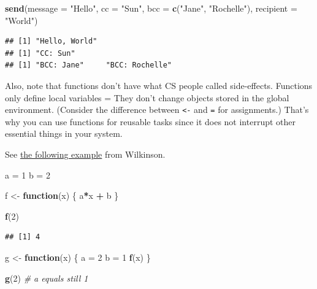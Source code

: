 \documentclass[
]{book}
\newenvironment{Shaded}{\begin{snugshade}}{\end{snugshade}}
\newcommand{\AttributeTok}[1]{\textcolor[rgb]{0.13,0.29,0.53}{#1}}
\newcommand{\CommentTok}[1]{\textcolor[rgb]{0.56,0.35,0.01}{\textit{#1}}}
\newcommand{\ControlFlowTok}[1]{\textcolor[rgb]{0.13,0.29,0.53}{\textbf{#1}}}
\newcommand{\DecValTok}[1]{\textcolor[rgb]{0.00,0.00,0.81}{#1}}
\newcommand{\FunctionTok}[1]{\textcolor[rgb]{0.13,0.29,0.53}{\textbf{#1}}}
\newcommand{\NormalTok}[1]{#1}
\newcommand{\OtherTok}[1]{\textcolor[rgb]{0.56,0.35,0.01}{#1}}
\newcommand{\SpecialCharTok}[1]{\textcolor[rgb]{0.81,0.36,0.00}{\textbf{#1}}}
\newcommand{\StringTok}[1]{\textcolor[rgb]{0.31,0.60,0.02}{#1}}
\begin{document}
\begin{Shaded}
\begin{Highlighting}[]
\FunctionTok{send}\NormalTok{(}\AttributeTok{message =} \StringTok{"Hello"}\NormalTok{, }\AttributeTok{cc =} \StringTok{"Sun"}\NormalTok{, }\AttributeTok{bcc =} \FunctionTok{c}\NormalTok{(}\StringTok{"Jane"}\NormalTok{, }\StringTok{"Rochelle"}\NormalTok{), }\AttributeTok{recipient =} \StringTok{"World"}\NormalTok{)}
\end{Highlighting}
\end{Shaded}

\begin{verbatim}
## [1] "Hello, World"
## [1] "CC: Sun"
## [1] "BCC: Jane"     "BCC: Rochelle"
\end{verbatim}

Also, note that functions don't have what CS people called side-effects. Functions only define local variables = They don't change objects stored in the global environment. (Consider the difference between \texttt{\textless{}-} and \texttt{=} for assignments.) That's why you can use functions for reusable tasks since it does not interrupt other essential things in your system.

See \href{https://darrenjw.wordpress.com/2011/11/23/lexical-scope-and-function-closures-in-r/}{the following example} from Wilkinson.

\begin{Shaded}
\begin{Highlighting}[]
\NormalTok{a }\OtherTok{=} \DecValTok{1} 
\NormalTok{b }\OtherTok{=} \DecValTok{2}

\NormalTok{f }\OtherTok{\textless{}{-}} \ControlFlowTok{function}\NormalTok{(x)}
\NormalTok{\{}
\NormalTok{  a}\SpecialCharTok{*}\NormalTok{x }\SpecialCharTok{+}\NormalTok{ b}
\NormalTok{\}}

\FunctionTok{f}\NormalTok{(}\DecValTok{2}\NormalTok{)}
\end{Highlighting}
\end{Shaded}

\begin{verbatim}
## [1] 4
\end{verbatim}

\begin{Shaded}
\begin{Highlighting}[]
\NormalTok{g }\OtherTok{\textless{}{-}} \ControlFlowTok{function}\NormalTok{(x)}
\NormalTok{\{}
\NormalTok{  a }\OtherTok{=} \DecValTok{2}
\NormalTok{  b }\OtherTok{=} \DecValTok{1}
  \FunctionTok{f}\NormalTok{(x)}
\NormalTok{\}}

\FunctionTok{g}\NormalTok{(}\DecValTok{2}\NormalTok{) }\CommentTok{\# a equals still 1 }
\end{Highlighting}
\end{Shaded}
\end{document}
